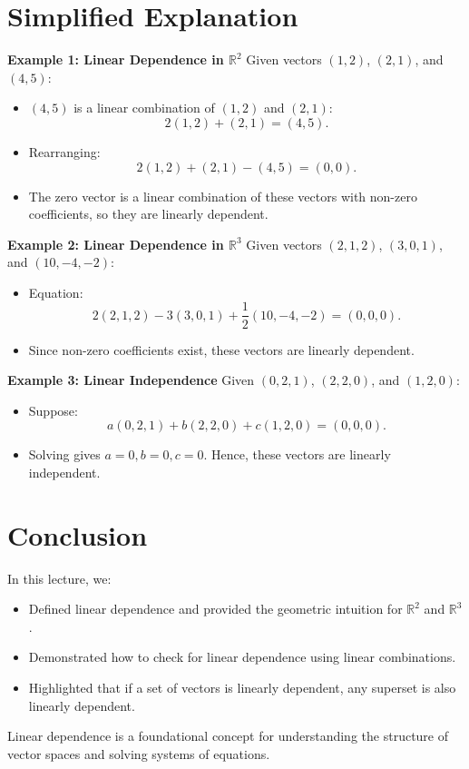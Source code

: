 \documentclass{article}
\begin{document}
\section*{Simplified Explanation}

\textbf{Example 1: Linear Dependence in $\mathbb{R}^2$}
Given vectors $(1, 2)$, $(2, 1)$, and $(4, 5)$:
\begin{itemize}
  \item $(4, 5)$ is a linear combination of $(1, 2)$ and $(2, 1)$:
    \[
      2(1, 2) + (2, 1) = (4, 5).
    \]
  \item Rearranging:
    \[
      2(1, 2) + (2, 1) - (4, 5) = (0, 0).
    \]
  \item The zero vector is a linear combination of these vectors with non-zero coefficients, so they are linearly dependent.
\end{itemize}

\textbf{Example 2: Linear Dependence in $\mathbb{R}^3$}
Given vectors $(2, 1, 2)$, $(3, 0, 1)$, and $(10, -4, -2)$:
\begin{itemize}
  \item Equation:
    \[
      2(2, 1, 2) - 3(3, 0, 1) + \frac{1}{2}(10, -4, -2) = (0, 0, 0).
    \]
  \item Since non-zero coefficients exist, these vectors are linearly dependent.
\end{itemize}

\textbf{Example 3: Linear Independence}
Given $(0, 2, 1)$, $(2, 2, 0)$, and $(1, 2, 0)$:
\begin{itemize}
  \item Suppose:
    \[
      a(0, 2, 1) + b(2, 2, 0) + c(1, 2, 0) = (0, 0, 0).
    \]
  \item Solving gives $a = 0, b = 0, c = 0$. Hence, these vectors are linearly independent.
\end{itemize}

\section*{Conclusion}

In this lecture, we:
\begin{itemize}
  \item Defined linear dependence and provided the geometric intuition for $\mathbb{R}^2$ and $\mathbb{R}^3$.
  \item Demonstrated how to check for linear dependence using linear combinations.
  \item Highlighted that if a set of vectors is linearly dependent, any superset is also linearly dependent.
\end{itemize}

Linear dependence is a foundational concept for understanding the structure of vector spaces and solving systems of equations.
\end{document}
